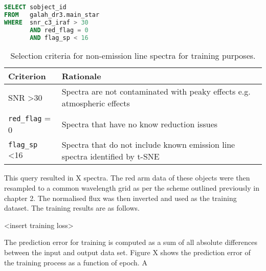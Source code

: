 \begin{lstlisting}[language=SQL]
SELECT sobject_id
FROM   galah_dr3.main_star
WHERE  snr_c3_iraf > 30
       AND red_flag = 0
       AND flag_sp < 16 
\end{lstlisting}

\begin{table}[!htb]
\begin{center}
\begin{tabular}{|l|l|}
\hline
\textbf{Criterion}    & \textbf{Rationale}                                                                 \\ \hline
SNR \textgreater 30   & Spectra are not contaminated with peaky effects e.g. atmospheric effects      \\ \hline
\texttt{red\_flag} = 0         & Spectra that have no know reduction issues                                  \\ \hline
\texttt{flag\_sp} \textless 16 & Spectra that do not include known emission line spectra identified by t-SNE \\ \hline
\end{tabular}
\caption{Selection criteria for non-emission line spectra for training purposes.}
\label{table:Selection Criteria}
\end{center}
\end{table}

This query resulted in X spectra. The red arm data of these objects were then resampled  to a common wavelength grid as per the scheme outlined previously in chapter 2. The normalised flux was then inverted and used as the training dataset. The training results are as follows.

<insert training loss>

The prediction error for training is computed as a sum of all absolute differences between the input and output data set. Figure X shows the prediction error of the training process as a function of epoch. A